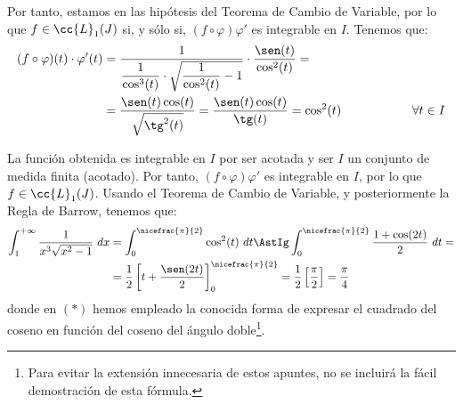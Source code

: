 \begin{ejercicio}
\begin{enumerate}
        Por tanto, estamos en las hipótesis del Teorema de Cambio de Variable, por lo que $f\in \cc{L}_1(J)$ si, y sólo si, $(f\circ \varphi)\varphi'$ es integrable en $I$.
        Tenemos que:
        \begin{align*}
            (f\circ \varphi)(t)\cdot \varphi'(t)
            &= \frac{1}{\dfrac{1}{\cos^3(t)}\cdot \sqrt{\dfrac{1}{\cos^2(t)}-1}}\cdot \frac{\sen (t)}{\cos^2(t)}
            =\\&= \frac{\sen(t)\cos(t)}{\sqrt{\tg^2(t)}}
            = \frac{\sen(t)\cos(t)}{\tg(t)}
            = \cos^2(t) \hspace{2cm} \forall t\in I
        \end{align*}

        La función obtenida es integrable en $I$ por ser acotada y ser $I$ un conjunto de medida finita (acotado).
        Por tanto, $(f\circ \varphi)\varphi'$ es integrable en $I$, por lo que $f\in \cc{L}_1(J)$.
        Usando el Teorema de Cambio de Variable, y posteriormente la Regla de Barrow, tenemos que:
        \begin{align*}
            \int_1^{+\infty} \dfrac{1}{x^3\sqrt{x^2-1}}~dx
            &= \int_0^{\nicefrac{\pi}{2}} \cos^2(t)~dt
            \AstIg \int_0^{\nicefrac{\pi}{2}} \frac{1+\cos(2t)}{2}~dt
            =\\&= \frac{1}{2}\left[t+\frac{\sen(2t)}{2}\right]_0^{\nicefrac{\pi}{2}}
            = \frac{1}{2}\left[\frac{\pi}{2}\right] = \frac{\pi}{4}
        \end{align*}
        donde en $(\ast)$ hemos empleado la conocida
        forma de expresar el cuadrado del coseno en función del
        coseno del ángulo doble\footnote{Para evitar la extensión innecesaria de estos apuntes, no se incluirá la fácil demostración de esta fórmula.}.
    \end{enumerate}
\end{ejercicio}

